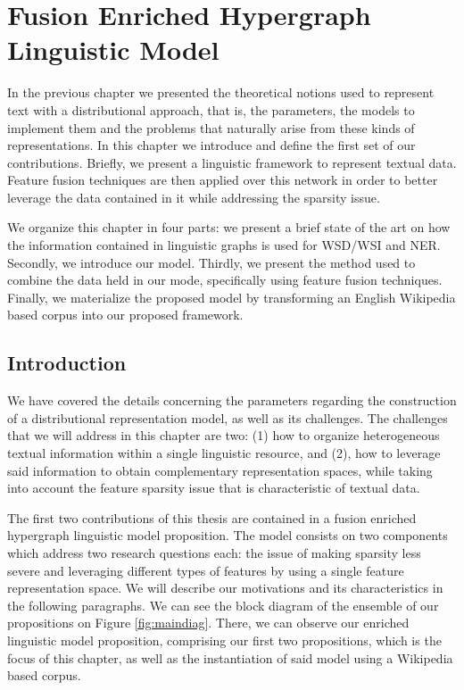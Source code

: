 \chapter{Fusion Enriched Hypergraph Linguistic Model}
\label{chap:ling_net}
\begin{abstractchap}
In the previous chapter we presented the theoretical notions used to represent text with a distributional approach, that is, the parameters, the models to implement them  and the problems that naturally arise from these kinds of representations. In this chapter we introduce and define the first set of our contributions. Briefly, we present a linguistic framework to represent textual data. Feature fusion techniques are then applied over this network in order to better leverage the data contained in it while addressing the sparsity issue.

We organize this  chapter  in four parts: we present a brief state of the art on how the information contained in linguistic graphs is used for WSD/WSI and NER. Secondly, we introduce our model. Thirdly, we present  the method used to combine the data held in our mode, specifically using feature fusion techniques. Finally, we materialize the proposed model by transforming an English Wikipedia based corpus into our proposed framework.
\end{abstractchap}
\minitoc

\section{Introduction}

We have covered the details concerning the parameters regarding the construction of a distributional representation model, as well as its challenges.
The challenges that we will address in this chapter are two: (1) how to organize heterogeneous textual information within a single linguistic resource, and (2), how to leverage said information to obtain complementary representation spaces, while taking into account the feature sparsity issue that is characteristic of textual data.


The first two contributions of this thesis are contained in a fusion enriched hypergraph linguistic model proposition. The model consists on two components which address two research questions each: the issue of making sparsity less severe and leveraging different types of features  by using a single feature representation space. We will describe our motivations and its characteristics in the following paragraphs. We can see the block diagram of the ensemble of our propositions  on Figure \ref{fig:maindiag}. There, we can observe our enriched linguistic model proposition, comprising our first two propositions, which is the focus of this chapter, as well as the instantiation of said model using a Wikipedia based corpus. %


